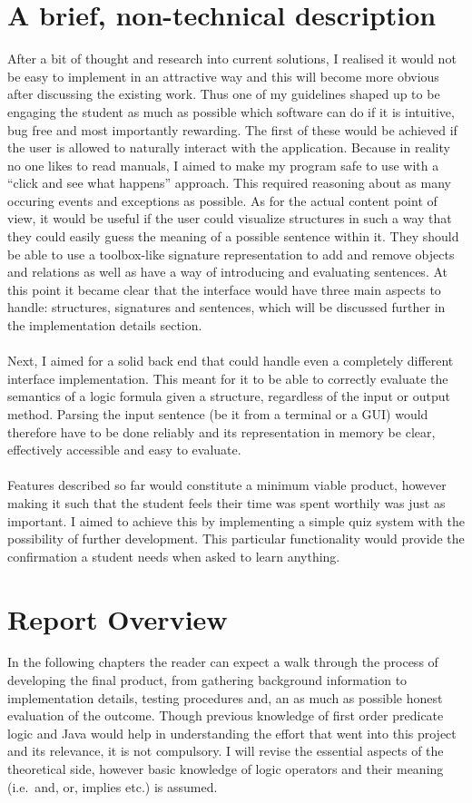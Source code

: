 \documentclass{report}
\begin{document}
\section{A brief, non-technical description}
After a bit of thought and research into current solutions, I realised it would 
not be easy to implement in an attractive way and this will become more obvious 
after discussing the existing work. Thus one of my guidelines shaped up to be 
engaging the student as much as possible which software can do if it is 
intuitive, bug free and most importantly rewarding. The first of these would be 
achieved if the user is allowed to naturally interact with the application. 
Because in reality no one likes to read manuals, I aimed to make my program safe
to use with a ``click and see what happens'' approach. This required reasoning 
about as many occuring events and exceptions as possible. As for the actual 
content point of view, it would be useful if the user could visualize structures
in such a way that they could easily guess the meaning of a possible sentence 
within it. They should be able to use a toolbox-like signature representation to 
add and remove objects and relations as well as have a way of introducing and 
evaluating sentences. At this point it became clear that the interface would 
have three main aspects to handle: structures, signatures and sentences, which 
will be discussed further in the implementation details section. 
\\ \\
Next, I aimed for a solid back end that could handle even a completely different 
interface implementation. This meant for it to be able to correctly evaluate the 
semantics of a logic formula given a structure, regardless of the input or 
output method. Parsing the input sentence (be it from a terminal or a GUI) would 
therefore have to be done reliably and its representation in memory be clear, 
effectively accessible and easy to evaluate. 
\\ \\
Features described so far would constitute a minimum viable product, however 
making it such that the student feels their time was spent worthily was just as 
important. I aimed to achieve this by implementing a simple quiz system with the 
possibility of further development. This particular functionality would provide 
the confirmation a student needs when asked to learn anything.

\section{Report Overview}
In the following chapters the reader can expect a walk through the process of 
developing the final product, from gathering background information to 
implementation details, testing procedures and, an as much as possible honest 
evaluation of the outcome. Though previous knowledge of first order predicate 
logic and Java would help in understanding the effort that went into this 
project and its relevance, it is not compulsory. I will revise the essential 
aspects of the theoretical side\cite{logicslides}, however basic knowledge of 
logic operators and their meaning (i.e.\ and, or, implies etc.) is assumed.
\end{document}
